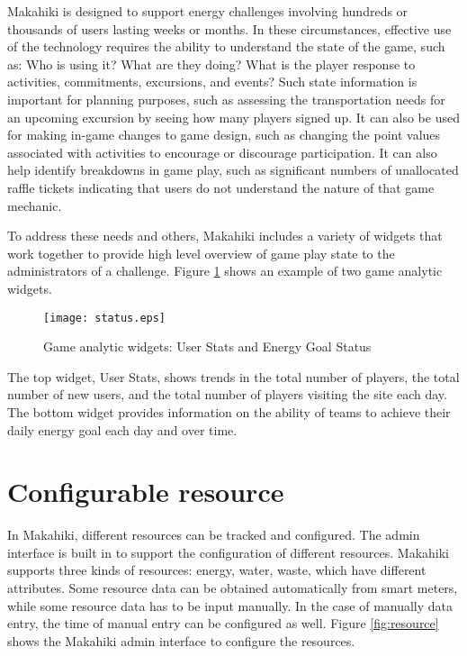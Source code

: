 Makahiki is designed to support energy challenges involving hundreds or thousands of users lasting weeks or months.  In these circumstances, effective use of the technology requires the ability to understand the state of the game, such as: Who is using it? What are they doing? What is the player response to activities, commitments, excursions, and events?   Such state information is important for planning purposes, such as assessing the transportation needs for an upcoming excursion by seeing how many players signed up.   It can also be used for making in-game changes to game design, such as changing the point values associated with activities to encourage or discourage participation.  It can also help identify breakdowns in game play, such as significant numbers of unallocated raffle tickets indicating that users do not understand the nature of that game mechanic.

To address these needs and others, Makahiki includes a variety of widgets that work together to provide high level overview of game play state to the administrators of a challenge. Figure \ref{fig:status} shows an example of two game analytic widgets.

\begin{figure}[t!]
  \center
  \texttt{[image: status.eps]}
  \caption{Game analytic widgets: User Stats and Energy Goal Status}
  \label{fig:status}
\end{figure}

The top widget, User Stats, shows trends in the total number of players, the total number of new users, and the total number of players visiting the site each day.  The bottom widget provides information on the ability of teams to achieve their daily energy goal each day and over time.

\section{Configurable resource}
In Makahiki, different resources can be tracked and configured. The admin interface is built in to support the configuration of different resources. Makahiki supports three kinds of resources: energy, water, waste, which have different attributes. Some resource data can be obtained automatically from smart meters, while some resource data has to be input manually. In the case of manually data entry, the time of manual entry can be configured as well. Figure \ref{fig:resource} shows the Makahiki admin interface to configure the resources.

